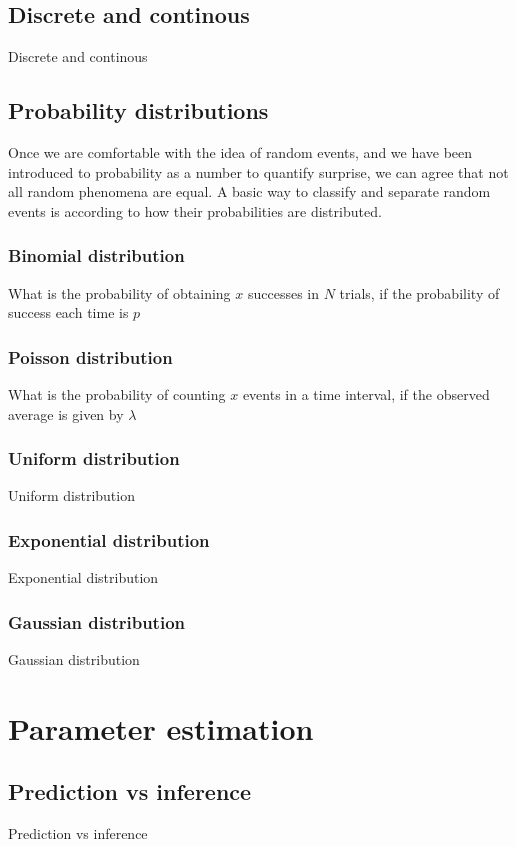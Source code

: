 \documentclass{book}
\begin{document}
\section{Discrete and continous}
Discrete and continous

\section{Probability distributions}
Once we are comfortable with the idea of random events, and we have been introduced to probability as a number to quantify surprise, we can agree that not all random phenomena are equal. A basic way to classify and separate random events is according to how their probabilities are distributed.

\subsection*{Binomial distribution}
What is the probability of obtaining $x$ successes in $N$ trials, if the probability of success each time is $p$

\subsection*{Poisson distribution}
What is the probability of counting $x$ events in a time interval, if the observed average is given by $\lambda$

\subsection*{Uniform distribution}
Uniform distribution

\subsection*{Exponential distribution}
Exponential distribution

\subsection*{Gaussian distribution}
Gaussian distribution


\chapter{Parameter estimation}

\section{Prediction vs inference}
Prediction vs inference
\end{document}
